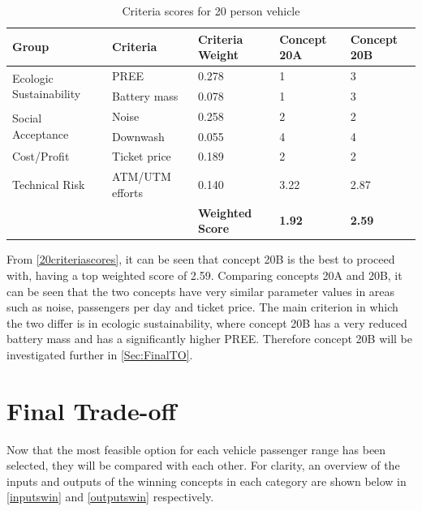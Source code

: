 \begin{table}[h]
\captionsetup{justification=centering}
\caption{Criteria scores for 20 person vehicle}
\label{20criteriascores}
\begin{tabular}{@{}lllll@{}}
\toprule
\textbf{Group}         &  \textbf{Criteria}         & \textbf{Criteria Weight}         & \textbf{Concept 20A} & \textbf{Concept 20B}      \\  \midrule
\multirow{2}{*}{Ecologic Sustainability} & PREE & 0.278                   & 1             & 3                  \\
                                         & Battery mass       & 0.078                   & 1             & 3                  \\\midrule
\multirow{2}{*}{Social Acceptance}       & Noise              & 0.258                   & 2             & 2                \\
                                         & Downwash           & 0.055                   & 4             & 4           \\\midrule
Cost/Profit                              & Ticket price       & 0.189                   & 2             & 2                  \\\midrule
Technical Risk                           & ATM/UTM efforts    & 0.140                   & 3.22          & 2.87                  \\  \midrule
\textbf{}                                & \textbf{}          & \textbf{Weighted Score} & \textbf{1.92} & \textbf{2.59}  \\ \bottomrule
\end{tabular}
\end{table}

From \autoref{20criteriascores}, it can be seen that concept 20B is the best to proceed with, having a top weighted score of 2.59. Comparing concepts 20A and 20B, it can be seen that the two concepts have very similar parameter values in areas such as noise, passengers per day and ticket price. The main criterion in which the two differ is in ecologic sustainability, where concept 20B  has a very reduced battery mass and has a significantly higher PREE. Therefore concept 20B  will be investigated further in \autoref{Sec:FinalTO}.  




\section{Final Trade-off}
\label{Sec:FinalTO}
Now that the most feasible option for each vehicle passenger range has been selected, they will be compared with each other. For clarity, an overview of the inputs and outputs of the winning concepts in each category are shown below in \autoref{inputswin} and \autoref{outputswin} respectively. 

